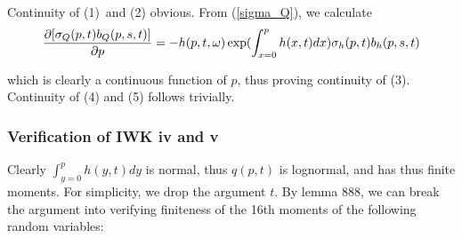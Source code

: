 \documentclass{article}
\begin{document}
Continuity of (1)\ and (2) obvious. From (\ref{sigma_Q}), we calculate 
\begin{equation}
\frac{\partial \lbrack \sigma _{Q}(p,t)b_{Q}(p,s,t)]}{\partial p}=-{%
h(p,t,\omega )}\exp ({\int_{x=0}^{p}h(x,t)dx)}\sigma _{h}(p,t)b_{h}(p,s,t)
\label{dsigmadp}
\end{equation}

which is clearly a continuous function of $p$, thus proving continuity of
(3). Continuity of (4) and (5) follows trivially.

\subsubsection{Verification of IWK iv and v}

Clearly ${\int_{y=0}^{p}h(y,t)dy}$ is normal, thus $q(p,t)$ is lognormal,
and has thus finite moments. For simplicity, we drop the argument $t$. By
lemma 888, we can break the argument into verifying finiteness of the 16th
moments of the following random variables:
\end{document}
